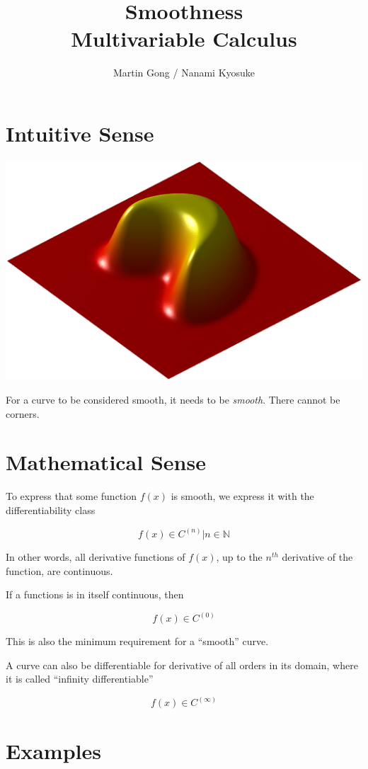 \documentclass[11pt]{article}
\title{Smoothness\\
    \large Multivariable Calculus}
\author{Martin Gong / Nanami Kyosuke}
\begin{document}
    \maketitle

    \section{Intuitive Sense}

    \hfil\includegraphics[scale=0.5]{assets/smoothness-1.png}

    For a curve to be considered smooth, it needs to be \textit{smooth}. There cannot be corners.

    \section{Mathematical Sense}

    To express that some function $f(x)$ is smooth, we express it with the differentiability class

    \[f(x) \in C^{(n)} \vert n \in \mathbb{N}\]

    In other words, all derivative functions of $f(x)$, up to the $n^{th}$ derivative of the function, are continuous.

    If a functions is in itself continuous, then

    \[f(x) \in C^{(0)}\]

    This is also the minimum requirement for a ``smooth'' curve.

    A curve can also be differentiable for derivative of all orders in its domain, where it is called ``infinity differentiable''

    \[f(x) \in C^{(\infty)}\]

    \section{Examples}
\end{document}
